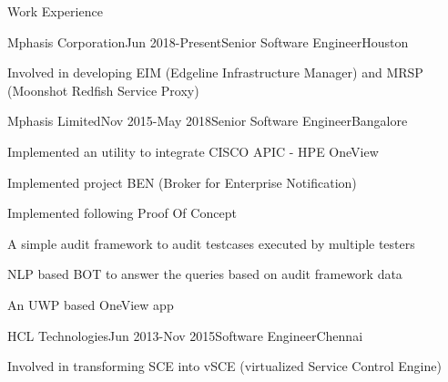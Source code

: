 \documentclass{resume} %
\begin{document}
\begin{rSection}{ Work Experience } \itemsep -1pt        

\begin{rSubsection}{Mphasis Corporation}{Jun 2018-Present}{Senior Software Engineer}{Houston}    

\vspace{-3pt}

\item Involved in developing EIM (Edgeline Infrastructure Manager) and MRSP (Moonshot Redfish Service Proxy)
\end{rSubsection} 

\vspace{-4pt}


\begin{rSubsection}{Mphasis Limited}{Nov 2015-May 2018}{Senior Software Engineer}{Bangalore}    

\vspace{-3pt}

\item Implemented an utility to integrate CISCO APIC - HPE OneView 
\item Implemented project BEN (Broker for Enterprise Notification)
\item Implemented following Proof Of Concept
\begin{list}{}{}
\vspace{-5pt}
\item A simple audit framework to audit testcases executed by multiple testers
\vspace{-5pt}
\item NLP based BOT to answer the queries based on audit framework data
\vspace{-5pt}
\item An UWP based OneView app
\end{list}
\end{rSubsection} 

\vspace{-4pt}


\begin{rSubsection}{HCL Technologies}{Jun 2013-Nov 2015}{Software Engineer}{Chennai}    

\vspace{-3pt}

\item Involved in transforming SCE into vSCE (virtualized Service Control Engine)


\end{rSubsection}
\end{rSection}
\end{document}
